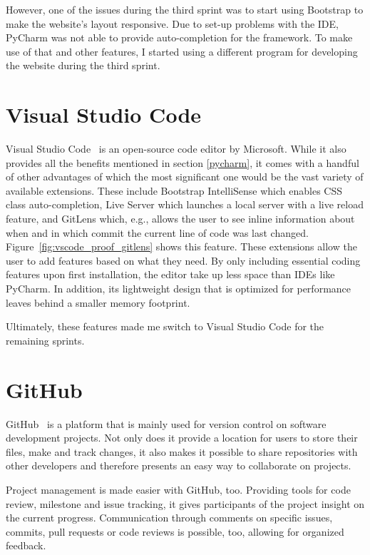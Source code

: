 However, one of the issues during the third sprint was to start using Bootstrap to make the website's layout responsive. Due to set-up problems with the IDE, PyCharm was not able to provide auto-completion for the framework. To make use of that and other features, I started using a different program for developing the website during the third sprint.

\section{Visual Studio Code}
Visual Studio Code~\cite{vscode} is an open-source code editor by Microsoft. While it also provides all the benefits mentioned in section \ref{pycharm}, it comes with a handful of other advantages of which the most significant one would be the vast variety of available extensions.
These include Bootstrap IntelliSense which enables CSS class auto-completion, Live Server which launches a local server with a live reload feature, and GitLens which, e.g., allows the user to see inline information about when and in which commit the current line of code was last changed. Figure~\ref{fig:vscode_proof_gitlens} shows this feature.
These extensions allow the user to add features based on what they need. By only including essential coding features upon first installation, the editor take up less space than IDEs like PyCharm.
In addition, its lightweight design that is optimized for performance leaves behind a smaller memory footprint.

Ultimately, these features made me switch to Visual Studio Code for the remaining sprints.

\section{GitHub}
GitHub~\cite{github} is a platform that is mainly used for version control on software development projects. Not only does it provide a location for users to store their files, make and track changes, it also makes it possible to share repositories with other developers and therefore presents an easy way to collaborate on projects.

Project management is made easier with GitHub, too. Providing tools for code review, milestone and issue tracking, it gives participants of the project insight on the current progress. Communication through comments on specific issues, commits, pull requests or code reviews is possible, too, allowing for organized feedback.

